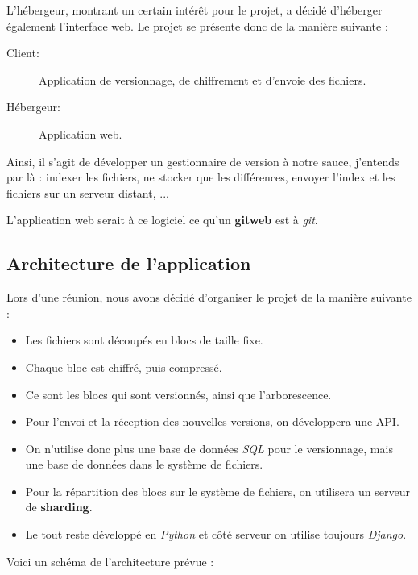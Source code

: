 L'hébergeur, montrant un certain intérêt pour le projet, a décidé d'héberger également
l'interface web. Le projet se présente donc de la manière suivante :

\begin{description}
     \item[Client:] Application de versionnage, de chiffrement et d'envoie des fichiers.
     \item[Hébergeur:] Application web.
\end{description}

Ainsi, il s'agit de développer un gestionnaire de version à notre sauce, j'entends par là :
indexer les fichiers, ne stocker que les différences, envoyer l'index et les fichiers sur un
serveur distant, ...

L'application web serait à ce logiciel ce qu'un \textbf{gitweb} est à \textit{git}.

\subsection{Architecture de l'application}

Lors d'une réunion, nous avons décidé d'organiser le projet de la manière suivante :

\begin{itemize}
     \item Les fichiers sont découpés en blocs de taille fixe.
     \item Chaque bloc est chiffré, puis compressé.
     \item Ce sont les blocs qui sont versionnés, ainsi que l'arborescence.
     \item Pour l'envoi et la réception des nouvelles versions, on développera une API.
     \item On n'utilise donc plus une base de données \textit{SQL} pour le versionnage, mais une base de données
     dans le système de fichiers.
     \item Pour la répartition des blocs sur le système de fichiers, on utilisera un serveur de \textbf{sharding}.
     \item Le tout reste développé en \textit{Python} et côté serveur on utilise toujours \textit{Django}.
\end{itemize}

Voici un schéma de l'architecture prévue :

